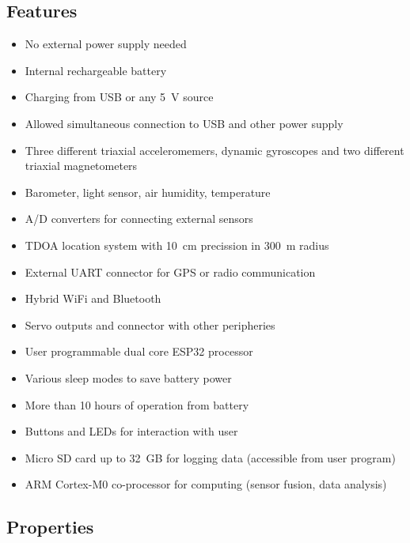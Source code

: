 \subsection{Features}
\begin{itemize}
	\setlength\itemsep{0.2em}
	\item No external power supply needed
	\item Internal rechargeable battery
	\item Charging from \ac{USB} or any \SI{5}{V} source
	\item Allowed simultaneous connection to \ac{USB} and other power supply
	\item Three different triaxial acceleromemers, dynamic gyroscopes and two different triaxial magnetometers
	\item Barometer, light sensor, air humidity, temperature
	\item A/D converters for connecting external sensors
	\item TDOA location system with \SI{10}{cm} precission in \SI{300}{m} radius
	\item External UART connector for GPS or radio communication
	\item Hybrid WiFi and Bluetooth
	\item Servo outputs and connector with other peripheries
	\item User programmable dual core ESP32 processor
	\item Various sleep modes to save battery power
	\item More than 10 hours of operation from battery
	\item Buttons and LEDs for interaction with user
	\item Micro SD card up to \SI{32}{GB} for logging data (accessible from user program)
	\item ARM Cortex-M0 co-processor for computing (sensor fusion, data analysis)
\end{itemize}

\subsection{Properties}

